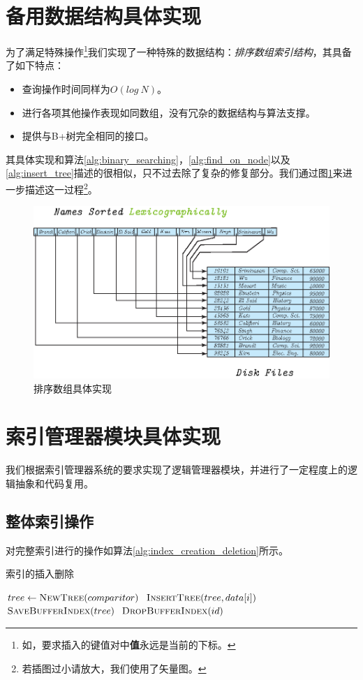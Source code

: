 \documentclass[UTF8]{ctexrep} %
\begin{document}
\section{备用数据结构具体实现}
为了满足特殊操作\footnote{如，要求插入的键值对中\textbf{值}永远是当前的下标。}我们实现了一种特殊的数据结构：\textit{排序数组索引结构}，其具备了如下特点：
\begin{itemize}
    \item 查询操作时间同样为$O(log\ N)$。
    \item 进行各项其他操作表现如同数组，没有冗杂的数据结构与算法支撑。
    \item 提供与B+树完全相同的接口。
\end{itemize}
其具体实现和算法\ref{alg:binary_searching}，\ref{alg:find_on_node}以及\ref{alg:insert_tree}描述的很相似，只不过去除了复杂的修复部分。我们通过图\ref{fig:sorted_list}来进一步描述这一过程\footnote{若插图过小请放大，我们使用了矢量图。}。

\begin{figure}[H]
    \centering
    \includegraphics[width=0.5\linewidth]{figure/sorted_list.eps}
    \caption{排序数组具体实现}
    \label{fig:sorted_list}
\end{figure}


\section{索引管理器模块具体实现}
我们根据索引管理器系统的要求实现了逻辑管理器模块，并进行了一定程度上的逻辑抽象和代码复用。

\subsection{整体索引操作}
对完整索引进行的操作如算法\ref{alg:index_creation_deletion}所示。

\algnewcommand{}
\algnewcommand\Raise{\item[\algorithmicraise]}

\begin{algorithm}
    \caption{索引的插入删除}
    \label{alg:index_creation_deletion}
    \begin{algorithmic}
            \State $tree \leftarrow \Call{NewTree}{comparitor}$
                \State $\Call{InsertTree}{tree, data[i]}$
            \EndFor
            \State $\Call{SaveBufferIndex}{tree}$
        \EndFunction
            \State $\Call{DropBufferIndex}{id}$
        \EndFunction
    \end{algorithmic}
\end{algorithm}
\end{document}
